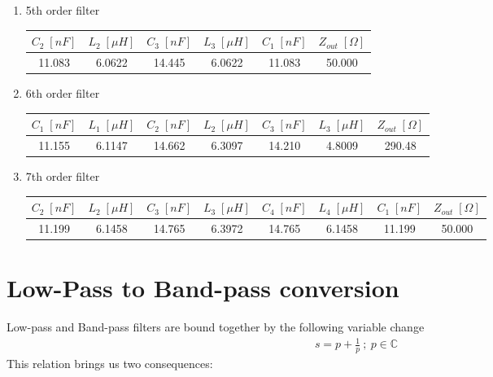 \documentclass[a4paper,12pt]{report}
\begin{document}
\begin{enumerate}
	\item 5th order filter
		
		\begin{tabular}{||c c c c c c ||} 
			\hline
			$C_2 \;[nF]$  & $L_2 \;[\mu H]$  & $C_3 \;[nF]$  & $L_3 \;[\mu H]$  & $C_1 \;[nF]$  & $Z_{out} \;[\Omega]$\\ [0.5ex] 
			\hline
			11.083 & 6.0622 & 14.445 & 6.0622 & 11.083 & 50.000\\ 
			\hline
		\end{tabular}
	
	\item 6th order filter
		
		\begin{tabular}{||c c c c c c c||} 
			\hline
			$C_1\;[nF]$  & $L_1\;[\mu H]$  & $C_2\;[nF]$  & $L_2\;[\mu H]$  & $C_3\;[nF]$ & $L_3 \;[\mu H]$ &$Z_{out}\;[\Omega]$\\ 	[0.5ex] 
			\hline
			11.155 & 6.1147 & 14.662 & 6.3097 & 14.210 & 4.8009 & 290.48\\ 
			\hline
		\end{tabular}
			
	\item 7th order filter
	
		\begin{tabular}{||c c c c c c c c||} 
			\hline
			$C_2 \;[nF]$  & $L_2 \;[\mu H]$  & $C_3 \;[nF]$  & $L_3 \;[\mu H]$  &$C_4 \;[nF]$  & $L_4 \;[\mu H]$  & $C_1 \;[nF]$  & $Z_{out} 	\;[\Omega]$\\ [0.5ex] 
			\hline
			11.199 & 6.1458 & 14.765 & 6.3972 & 14.765 & 6.1458 & 11.199 & 50.000\\ 
			\hline
		\end{tabular}
\end{enumerate}

\section{Low-Pass to Band-pass conversion}

Low-pass and Band-pass filters are bound together by the following variable change
\begin{align}
	s = p + \frac{1}{p} \ ; \ p \in \mathbb{C}
\end{align}
This relation brings us two consequences:
\end{document}
